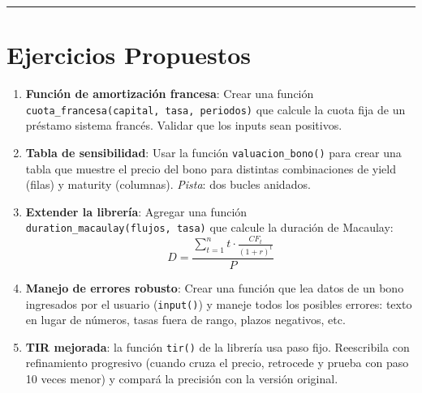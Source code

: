 \documentclass[
  spanish,
  letterpaper,
  DIV=11,
  numbers=noendperiod]{scrreprt}
\begin{document}
\begin{center}\rule{0.5\linewidth}{0.5pt}\end{center}

\section{Ejercicios Propuestos}\label{ejercicios-propuestos-2}

\begin{tcolorbox}[enhanced jigsaw, bottomrule=.15mm, colback=white, opacitybacktitle=0.6, arc=.35mm, toprule=.15mm, opacityback=0, breakable, titlerule=0mm, left=2mm, coltitle=black, colbacktitle=quarto-callout-important-color!10!white, colframe=quarto-callout-important-color-frame, leftrule=.75mm, toptitle=1mm, bottomtitle=1mm, title=\textcolor{quarto-callout-important-color}{\faExclamation}\hspace{0.5em}{Ejercicios}, rightrule=.15mm]

\begin{enumerate}
\def\labelenumi{\arabic{enumi}.}
\item
  \textbf{Función de amortización francesa}: Crear una función
  \texttt{cuota\_francesa(capital,\ tasa,\ periodos)} que calcule la
  cuota fija de un préstamo sistema francés. Validar que los inputs sean
  positivos.
\item
  \textbf{Tabla de sensibilidad}: Usar la función
  \texttt{valuacion\_bono()} para crear una tabla que muestre el precio
  del bono para distintas combinaciones de yield (filas) y maturity
  (columnas). \emph{Pista}: dos bucles anidados.
\item
  \textbf{Extender la librería}: Agregar una función
  \texttt{duration\_macaulay(flujos,\ tasa)} que calcule la duración de
  Macaulay:
  \[D = \frac{\sum_{t=1}^{n} t \cdot \frac{CF_t}{(1+r)^t}}{P}\]
\item
  \textbf{Manejo de errores robusto}: Crear una función que lea datos de
  un bono ingresados por el usuario (\texttt{input()}) y maneje todos
  los posibles errores: texto en lugar de números, tasas fuera de rango,
  plazos negativos, etc.
\item
  \textbf{TIR mejorada}: la función \texttt{tir()} de la librería usa
  paso fijo. Reescribila con refinamiento progresivo (cuando cruza el
  precio, retrocede y prueba con paso 10 veces menor) y compará la
  precisión con la versión original.
\end{enumerate}

\end{tcolorbox}
\end{document}
